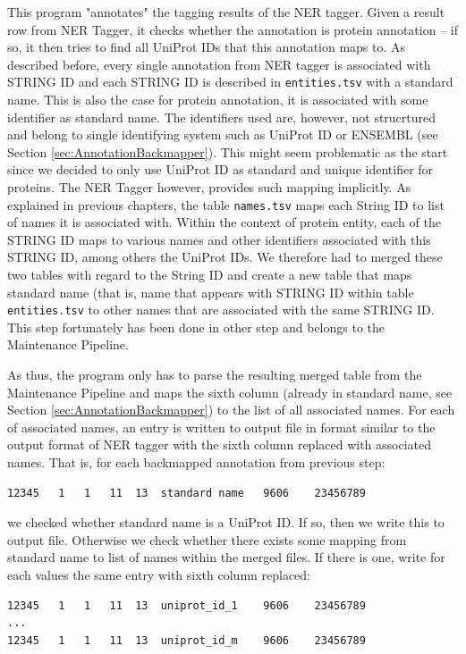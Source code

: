 This program "annotates" the tagging results of the NER tagger. Given a result row from NER Tagger, it checks whether the annotation is protein annotation -- if so, it then tries to find all UniProt IDs that this annotation maps to. As described before, every single annotation from NER tagger is associated with STRING ID and each STRING ID is described in \texttt{entities.tsv} with a standard name. This is also the case for protein annotation, it is associated with some identifier as standard name. The identifiers used are, however, not strucrtured and belong to single identifying system such as UniProt ID or ENSEMBL (see Section \ref{sec:AnnotationBackmapper}). This might seem problematic as the start since we decided to only use UniProt ID as standard and unique identifier for proteins. The NER Tagger however, provides such mapping implicitly. As explained in previous chapters, the table \texttt{names.tsv} maps each String ID to list of names it is associated with. Within the context of protein entity, each of the STRING ID maps to various names and other identifiers associated with this STRING ID, among others the UniProt IDs. We therefore had to merged these two tables with regard to the String ID and create a new table that maps standard name (that is, name that appears with STRING ID within table \texttt{entities.tsv} to other names that are associated with the same STRING ID. This step fortunately has been done in other step and belongs to the Maintenance Pipeline.

As thus, the program only has to parse the resulting merged table from the Maintenance Pipeline and maps the sixth column (already in standard name, see Section \ref{sec:AnnotationBackmapper}) to the list of all associated names. For each of associated names, an entry is written to output file in format similar to the output format of NER tagger with the sixth column replaced with associated names. That is, for each backmapped annotation from previous step:

\begin{verbatim}
12345	1	1	11	13	standard name	9606	23456789
\end{verbatim}

we checked whether standard name is a UniProt ID. If so, then we write this to output file. Otherwise we check whether there exists some mapping from standard name to list of names within the merged files. If there is one, write for each values the same entry with sixth column replaced:

\begin{verbatim}
12345	1	1	11	13	uniprot_id_1	9606	23456789
...
12345	1	1	11	13	uniprot_id_m	9606	23456789
\end{verbatim}



